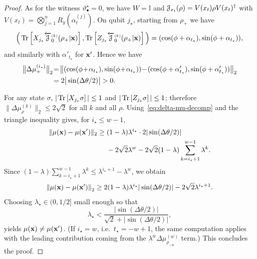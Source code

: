 \begin{proof}
    As for the witness $\vartheta_\bullet^\star=0$, we have $W=\mathbb I$ and ${\mathcal{J}}_{x_t}(\rho)=V(x_t)\rho V(x_t)^\dagger$ with $V(x_t)=\bigotimes_{j=1}^n R_y(\alpha_t^{(j)})$. On qubit $j_\star$, starting from $\rho_+$ we have
    \[
    \Big(\operatorname{Tr}\left[X_{j_\star} \overleftarrow{{\mathcal{J}}}^{\scriptscriptstyle( k )}_{0}(\rho_+|{\mathbf{x}})\right],
    \operatorname{Tr}\left[Z_{j_\star} \overleftarrow{{\mathcal{J}}}^{\scriptscriptstyle( k )}_{0}(\rho_+|{\mathbf{x}})\right]\Big)
    =
    (\cos(\phi+\alpha_{t_\star}), \sin(\phi+\alpha_{t_\star})),
    \]
    and similarly with $\alpha'_{t_\star}$ for ${\mathbf{x}}'$.
    Hence we have
    \begin{equation}\label{eq:lead-delta}
    \begin{aligned}
        \big\|\Delta\mu^{(i_\star)}_{+}\big\|_2
        \!&=\!
        \normeuc{(\cos(\phi\!+\!\alpha_{t_\star}),\sin(\phi\!+\!\alpha_{t_\star}))
        \!-\!(\cos(\phi+\alpha'_{t_\star}),\sin(\phi+\alpha'_{t_\star}))}\\
        &=
        2\big|\sin(\Delta\theta/2)\big|
        >0.
    \end{aligned}
    \end{equation}

    For any state $\sigma$, $|\operatorname{Tr}\left[X_{j_\star}\sigma\right]|\le 1$ and $|\operatorname{Tr}\left[Z_{j_\star}\sigma\right]|\le 1$;
    therefore $\|\Delta\mu^{(k)}_{\rho}\|_2\le 2\sqrt{2}$ for all $k$ and all $\rho$.
    Using~\cref{eq:delta-mu-decomp} and the triangle inequality gives, for $i_\star \le w-1$,
    \[
    \begin{aligned}
        \|\mu({\mathbf{x}})-\mu({\mathbf{x}}')\|_2
        \ge\;&(1-\lambda)\lambda^{i_\star}\cdot 2|\sin(\Delta\theta/2)|\\
        &-
        2\sqrt{2}\lambda^w
        -
        2\sqrt{2}(1-\lambda)\sum_{k=i_\star+1}^{w-1}\lambda^{k}.
    \end{aligned}
    \]
    Since $(1-\lambda)\sum_{k=i_\star+1}^{w-1}\lambda^{k}\le \lambda^{i_\star+1} - \lambda^w$, we obtain
    \[
    \begin{aligned}
    \left\lVert\mu({\mathbf{x}})-\mu({\mathbf{x}}')\right\rVert_{2}
    \ge 2(1-\lambda)\lambda^{i_\star}|\sin(\Delta\theta/2)| - 2\sqrt{2}\lambda^{i_\star+1}.
    \end{aligned}
    \]
    Choosing $\lambda_\star \in (0,1/2]$ small enough so that
    \[
    \lambda_\star < \frac{|\sin(\Delta\theta/2)|}{\sqrt{2} + |\sin(\Delta\theta/2)|},
    \]
    yields $\mu({\mathbf{x}})\neq\mu({\mathbf{x}}')$. (If $i_\star=w$, i.e.\ $t_\star=-w+1$, the same computation applies with the leading contribution coming from the $\lambda^w \Delta\mu^{(w)}_{\rho_{-w}}$ term.) This concludes the proof.
    
\end{proof}

